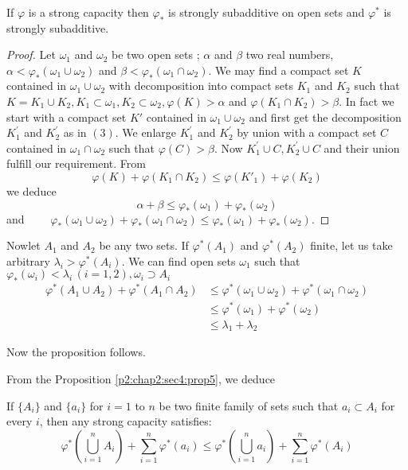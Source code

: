 \begin{prop}\label{p2:chap2:sec5:prop6}%
  If $\varphi$ is a strong capacity then $\varphi_*$ is strongly
  subadditive on open sets and $\varphi^*$ is strongly subadditive. 
\end{prop}

\begin{proof} %
  Let $\omega_1$ and $\omega_2$ be two open sets ; $\alpha$ and
  $\beta$ two real numbers, $\alpha < \varphi_* (\omega_1 \cup
  \omega_2)$ and $\beta < \varphi_* (\omega_1 \cap \omega_2)$. We may
  find a compact set $K$ contained in $\omega_1 \cup \omega_2$ with
  decomposition into compact sets $K_1$ and $K_2$ such that $K = K_1
  \cup K_2, K_1 \subset \omega_1, K_2 \subset \omega_2, \varphi (K) >
  \alpha$ and $\varphi (K_1 \cap K_2) > \beta$. In fact we start with
  a compact set $K'$ contained in $\omega_1 \cup \omega_2$  and first
  get the decomposition $K^{'}_{1}$ and $K^{'}_{2}$ as in $(3)$. We
  enlarge $K^{'}_{1}$ and $K^{'}_{2}$ by union with a compact set $C$
  contained in $\omega_1 \cap \omega_2$ such that $\varphi (C) >
  \beta$. Now $K^{'}_{1} \cup C, K^{'}_{2} \cup C$ and their union
  fulfill our requirement. From 
  $$
  \varphi(K) + \varphi(K_1 \cap K_2) \le \varphi(K'_{1}) + \varphi (K_2)
  $$
  we deduce
  $$
  \alpha + \beta \le \varphi_* (\omega_1) + \varphi_* (\omega_2)
  $$
  and $\qquad \varphi_* (\omega_1 \cup \omega_2) + \varphi_* (\omega_1
  \cap \omega_2) \le \varphi_* (\omega_1) + \varphi_*(\omega_2)$. 
\end{proof}

Now\pageoriginale let $A_1$ and $A_2$ be any two sets. If $\varphi^* (A_1)$ and
$\varphi^*(A_2)$ finite, let us take arbitrary $\lambda_i > \varphi^*
(A_i)$. We can find open sets $\omega_1$ such that $\varphi_*
(\omega_i) < \lambda_i \,(i = 1, 2), \omega_i \supset A_i$ 
\begin{align*}
  \varphi^* (A_1 \cup A_2) + \varphi^* (A_1 \cap A_2) & \le  \varphi^*
  (\omega_1 \cup \omega_2) + \varphi^* (\omega_1 \cap \omega_2)\\ 
  & \le \varphi^* (\omega_1) + \varphi^* (\omega_2)\\
  & \le \lambda_1 + \lambda_2
\end{align*}

Now the proposition follows.

From the Proposition \ref{p2:chap2:sec4:prop5}, we deduce
\begin{coro*}
  If $\{A_i\}$ and $\{a_i\}$ for $i = 1$ to $n$ be two finite family
  of sets such that $a_i \subset A_i$ for every $i$, then any strong
  capacity satisfies: 
  $$
  \varphi^* \left(\bigcup^{n}_{i = 1} A_i\right) + \sum^{n}_{i = 1} \varphi^*
  (a_i) \le \varphi^* \left(\bigcup^{n}_{i = 1} a_i\right) + \sum^{n}_{i = 1}
  \varphi^* (A_i) 
  $$
\end{coro*}

